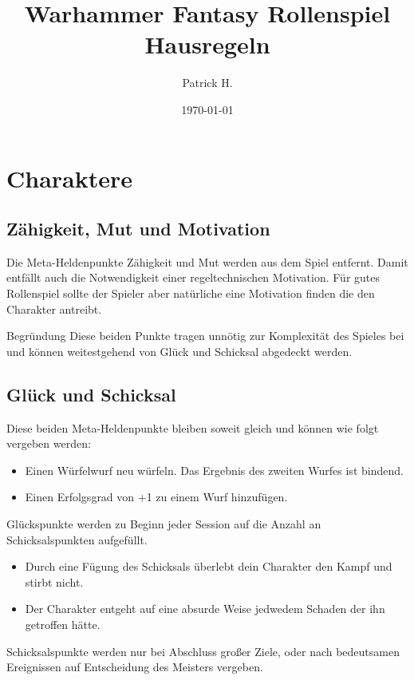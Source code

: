 \documentclass[letterpaper,twocolumn,nodeprecatedcode]{article}
\title{Warhammer Fantasy Rollenspiel\\Hausregeln}
\author{Patrick H.}
\date{\today}
\begin{document}

\maketitle

\section{Charaktere}

\subsection{Zähigkeit, Mut und Motivation}
Die Meta-Heldenpunkte Zähigkeit und Mut werden aus dem Spiel entfernt. 
Damit entfällt auch die Notwendigkeit einer regeltechnischen Motivation. 
Für gutes Rollenspiel sollte der Spieler aber natürliche eine Motivation finden die den Charakter antreibt.

\begin{DndComment}{Begründung}
  Diese beiden Punkte tragen unnötig zur Komplexität des Spieles bei und können weitestgehend von Glück und Schicksal abgedeckt werden.
\end{DndComment}

\subsection{Glück und Schicksal}
Diese beiden Meta-Heldenpunkte bleiben soweit gleich und können wie folgt vergeben werden:
\begin{itemize}
  \item Einen Würfelwurf neu würfeln. Das Ergebnis des zweiten Wurfes ist bindend.
  \item Einen Erfolgsgrad von +1 zu einem Wurf hinzufügen.
\end{itemize}
Glückspunkte werden zu Beginn jeder Session auf die Anzahl an Schicksalspunkten aufgefüllt.

\begin{itemize}
  \item Durch eine Fügung des Schicksals überlebt dein Charakter den Kampf und stirbt nicht.
  \item Der Charakter entgeht auf eine absurde Weise jedwedem Schaden der ihn getroffen hätte.
\end{itemize}
Schicksalspunkte werden nur bei Abschluss großer Ziele, oder nach bedeutsamen Ereignissen auf Entscheidung des Meisters vergeben.
\end{document}
